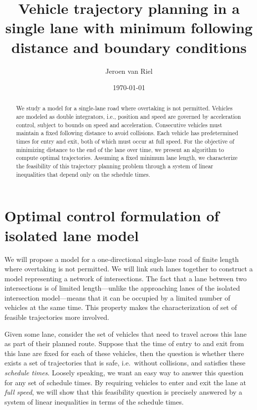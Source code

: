 \documentclass[a4paper]{article}
\author{Jeroen van Riel}
\date{\monthyeardate\today}
\title{Vehicle trajectory planning in a single lane with minimum following
  distance and boundary conditions}
\theoremstyle{definition}
\theoremstyle{plain}
\begin{document}
\maketitle

\begin{abstract}
  We study a model for a single-lane road where overtaking is not permitted.
  Vehicles are modeled as double integrators, i.e., position and speed are
  governed by acceleration control, subject to bounds on speed and acceleration.
  Consecutive vehicles must maintain a fixed following distance to avoid
  collisions.
  Each vehicle has predetermined times for entry and exit, both of which must
  occur at full speed.
  For the objective of minimizing distance to the end of the lane over time, we
  present an algorithm to compute optimal trajectories.
  Assuming a fixed minimum lane length, we characterize the feasibility of this
  trajectory planning problem through a system of linear inequalities that
  depend only on the schedule times.
\end{abstract}


\newcommand\halfopen[2]{\ensuremath{[#1,#2)}}
\newcommand\openhalf[2]{\ensuremath{(#1,#2]}}

\renewcommand{\labelitemii}{\textbullet}
\renewcommand{\labelitemiii}{\textbullet}

\newcommand\note[1]{{\color{Navy}#1}}

\section{Optimal control formulation of isolated lane model}

We will propose a model for a one-directional single-lane road of finite length
where overtaking is not permitted.
%
We will link such lanes together to construct a model representing a
network of intersections.
%
The fact that a lane between two intersections is of limited length---unlike the
approaching lanes of the isolated intersection model---means that it can be
occupied by a limited number of vehicles at the same time.
%
This property makes the characterization of set of feasible trajectories more
involved.

Given some lane, consider the set of vehicles that need to travel across this
lane as part of their planned route. Suppose that the time of entry to and exit
from this lane are fixed for each of these vehicles, then the question is
whether there exists a set of trajectories that is safe, i.e.\ without
collisions, and satisfies these \emph{schedule times}.
%
Loosely speaking, we want an easy way to answer this question for any set of
schedule times.
%
By requiring vehicles to enter and exit the lane at \emph{full speed}, we will
show that this feasibility question is precisely answered by a system of linear
inequalities in terms of the schedule times.
\end{document}
